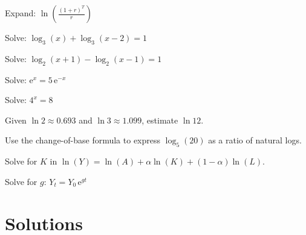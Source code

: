 \begin{problems}
  \item Expand: $\displaystyle\ln\left(\frac{(1+r)^{T}}{r}\right)$
  \item Solve: $\log_{3}(x)+\log_{3}(x-2)=1$
  \item Solve: $\log_{2}(x+1)-\log_{2}(x-1)=1$
  \item Solve: $\mathrm{e}^{x}=5\,\mathrm{e}^{-x}$
  \item Solve: $4^{x}=8$
  \item Given $\ln 2\approx 0.693$ and $\ln 3\approx 1.099$, estimate
        $\ln 12$.
  \item Use the change-of-base formula to express $\log_{5}(20)$ as a ratio
        of natural logs.
  \item Solve for $K$ in $\ln(Y)=\ln(A)+\alpha\ln(K)+(1-\alpha)\ln(L)$.
  \item Solve for $g$: $Y_{t}=Y_{0}\,\mathrm{e}^{gt}$
\end{problems}

\section{Solutions}


